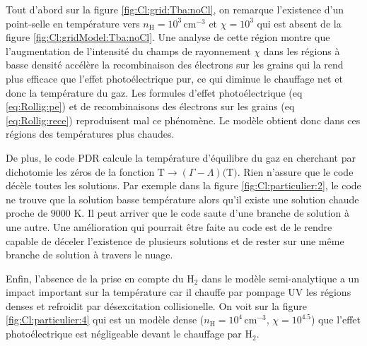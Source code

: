 Tout d'abord sur la figure \ref{fig:Cl:grid:Tba:noCl}, on remarque l'existence d'un point-selle en température vers $n_\mathrm{H}=10^3 \, \mathrm{cm}^{-3}$ et $\chi=10^3$ qui est absent de la figure \ref{fig:Cl:gridModel:Tba:noCl}. Une analyse de cette région montre que l'augmentation de l'intensité du champs de rayonnement $\chi$ dans les régions à basse densité accélère la recombinaison des électrons sur les grains qui la rend plus efficace que l'effet photoélectrique pur, ce qui diminue le chauffage net et donc la température du gaz. Les formules d'effet photoélectrique (eq \ref{eq:Rollig:pe}) et de recombinaisons des électrons sur les grains (eq \ref{eq:Rollig:rece}) reproduisent mal ce phénomène. Le modèle obtient donc dans ces régions des températures plus chaudes. \newline 

De plus, le code PDR calcule la température d'équilibre du gaz en cherchant par dichotomie les zéros de la fonction $\mathrm{T} \rightarrow (\Gamma - \Lambda)(\mathrm{T)}$. Rien n'assure que le code décèle toutes les solutions. Par exemple dans la figure \ref{fig:Cl:particulier:2}, le code ne trouve que la solution basse température alors qu'il existe une solution chaude proche de $9000$ K. Il peut arriver que le code saute d'une branche de solution à une autre. Une amélioration qui pourrait être faite au code est de le rendre capable de déceler l'existence de plusieurs solutions et de rester sur une même branche de solution à travers le nuage. \newline 

Enfin, l'absence de la prise en compte du $\mathrm{H}_2$ dans le modèle semi-analytique a un impact important sur la température car il chauffe par pompage UV les régions denses et refroidit par désexcitation collisionelle. On voit sur la figure \ref{fig:Cl:particulier:4} qui est un modèle dense ($n_\mathrm{H}=10^4 \, \mathrm{cm}^{-3}$, $\chi=10^{4.5}$) que l'effet photoélectrique est négligeable devant le chauffage par $\mathrm{H}_2$. 


